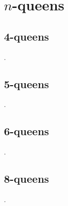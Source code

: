 \documentclass{article}
\begin{document}
\section*{$n$-queens}

\subsection*{4-queens}
.

\subsection*{5-queens}
.

\subsection*{6-queens}
.

\subsection*{8-queens}
.
\end{document}
